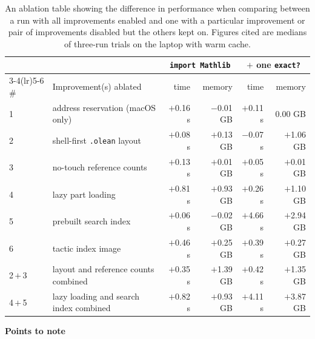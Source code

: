 \documentclass{article}
\begin{document}
\begin{table}[htbp]
\centering
\footnotesize
\setlength{\tabcolsep}{4pt}
\begin{tabular}{llrrrr}
\toprule
 & & \multicolumn{2}{c}{\texttt{import Mathlib}} & \multicolumn{2}{c}{$+$ one \texttt{exact?}} \\
\cmidrule(lr){3-4}\cmidrule(lr){5-6}
\# & Improvement(s) ablated & time & memory & time & memory \\
\midrule
1 & address reservation (macOS only) & $+$0.16 s & $-$0.01 GB & $+$0.11 s & 0.00 GB \\
2 & shell-first \texttt{.olean} layout & $+$0.08 s & $+$0.13 GB & $-$0.07 s & $+$1.06 GB \\
3 & no-touch reference counts & $+$0.13 s & $+$0.01 GB & $+$0.05 s & $+$0.01 GB \\
4 & lazy part loading & $+$0.81 s & $+$0.93 GB & $+$0.26 s & $+$1.10 GB \\
5 & prebuilt search index & $+$0.06 s & $-$0.02 GB & $+$4.66 s & $+$2.94 GB \\
6 & tactic index image & $+$0.46 s & $+$0.25 GB & $+$0.39 s & $+$0.27 GB \\
\midrule
2\,$+$\,3 & layout and reference counts combined & $+$0.35 s & $+$1.39 GB & $+$0.42 s & $+$1.35 GB \\
4\,$+$\,5 & lazy loading and search index combined & $+$0.82 s & $+$0.93 GB & $+$4.11 s & $+$3.87 GB \\
\bottomrule
\end{tabular}
\caption{An ablation table showing the difference in performance when comparing between a run with all improvements enabled and one with a particular improvement or pair of improvements disabled but the others kept on. Figures cited are medians of three-run trials on the laptop with warm cache. 
}
\label{tab:contributions}
\end{table}

\noindent \textbf{Points to note}
\end{document}
